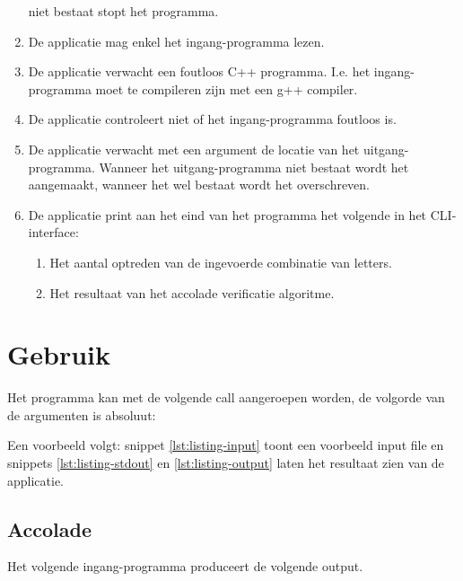 \documentclass[10pt]{article}
\begin{document}
\begin{enumerate}
            niet bestaat stopt het programma.
      \item De applicatie mag enkel het ingang-programma lezen.
      \item De applicatie verwacht een foutloos C++ programma. I.e. het ingang-programma moet te compileren zijn met
            een
            g++ compiler.
      \item De applicatie controleert niet of het ingang-programma foutloos is.
      \item De applicatie verwacht met een argument de locatie van het uitgang-programma. Wanneer het uitgang-programma
            niet bestaat wordt het aangemaakt, wanneer het wel bestaat wordt het overschreven.
      \item De applicatie print aan het eind van het programma het volgende in het CLI-interface:
            \begin{enumerate}
                  \item Het aantal optreden van de ingevoerde combinatie van letters.
                  \item Het resultaat van het accolade verificatie algoritme.
            \end{enumerate}
\end{enumerate}

\section{Gebruik}
Het programma kan met de volgende call aangeroepen worden, de volgorde van de argumenten is absoluut:


Een voorbeeld volgt: snippet \ref{lst:listing-input} toont een voorbeeld input file en snippets
\ref{lst:listing-stdout} en \ref{lst:listing-output} laten het resultaat zien van de applicatie.





\subsection{Accolade}
Het volgende ingang-programma produceert de volgende output.


\end{document}
